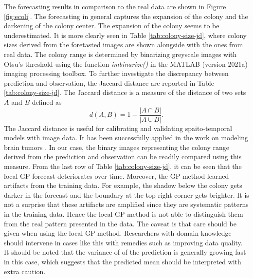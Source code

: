 \documentclass[smallextended,natbib]{svjour3}       %
\begin{document}
The forecasting results in comparison to the real data are shown in Figure \ref{fig:ecoli}. The forecasting in general captures the expansion of the colony and the darkening of the colony center. The expansion of the colony seems to be underestimated. It is more clearly seen in Table \ref{tab:colony-size-jd}, where colony sizes derived from the foretasted images are shown alongside with the ones from real data. The colony range is determined by binarizing greyscale images with Otsu's threshold \citep{otsu1979threshold} using the function \textit{imbinarize()} in the MATLAB (version 2021a) imaging processing toolbox. To further investigate the discrepancy between prediction and observation, the Jaccard distance are reported in Table \ref{tab:colony-size-jd}. The Jaccard distance is a measure of the distance of two sets $A$ and $B$ defined as \[d(A,B)=1-\frac{\vert A \cap B \vert}{\vert A \cup B \vert}.\] The Jaccard distance is useful for calibrating and validating spaito-temporal models with image data. It has been successfully applied in the work on modeling brain tumors \citep{rutter2017mathematical}. In our case, the binary images representing the colony range derived from the prediction and observation can be readily compared using this measure. From the last row of Table \ref{tab:colony-size-jd}, it can be seen that the local GP forecast deteriorates over time. Moreover, the GP method learned artifacts from the training data. For example, the shadow below the colony gets darker in the forecast and the boundary at the top right corner gets brighter. It is not a surprise that these artifacts are amplified since they are systematic patterns in the training data. Hence the local GP method is not able to distinguish them from the real pattern presented in the data. The caveat is that care should be given when using the local GP method. Researchers with domain knowledge should intervene in cases like this with remedies such as improving data quality. It should be noted that the variance of of the prediction is generally growing fast in this case, which suggests that the predicted mean should be interpreted with extra caution.          
\end{document}
